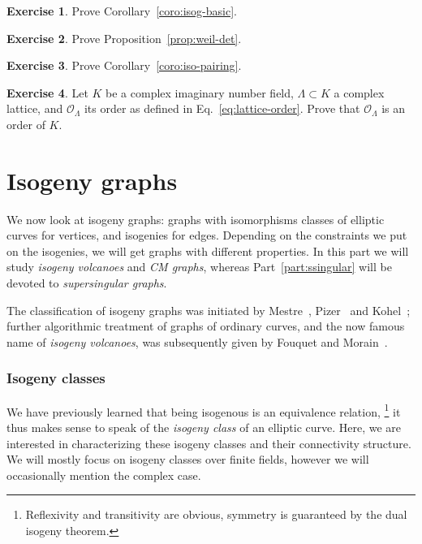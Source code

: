 \documentclass[10pt]{article}
\theoremstyle{plain}
\theoremstyle{definition}
\newtheorem{exercise}{Exercise}[part]
\def\O{\ensuremath{\mathcal{O}}}
\begin{document}
\begin{exercise}
  Prove Corollary~\ref{coro:isog-basic}.
\end{exercise}

\begin{exercise}
  Prove Proposition~\ref{prop:weil-det}.
\end{exercise}

\begin{exercise}
  Prove Corollary~\ref{coro:iso-pairing}.
\end{exercise}

\begin{exercise}
  Let $K$ be a complex imaginary number field, $Λ⊂K$ a complex
  lattice, and $\O_Λ$ its order as defined in
  Eq.~\eqref{eq:lattice-order}. %
  Prove that $\O_Λ$ is an order of $K$.
\end{exercise}



\clearpage
\part{Isogeny graphs}
\label{part:isogeny-graphs}

We now look at isogeny graphs: graphs with isomorphisms classes of
elliptic curves for vertices, and isogenies for edges. %
Depending on the constraints we put on the isogenies, we will get
graphs with different properties. %
In this part we will study \emph{isogeny volcanoes} and \emph{CM graphs},
whereas Part~\ref{part:ssingular} will be devoted to
\emph{supersingular graphs}.

The classification of isogeny graphs was initiated by
Mestre~\cite{mestre86}, Pizer~\cite{pizer1,pizer2} and
Kohel~\cite{kohel}; further algorithmic treatment of graphs of
ordinary curves, and the now famous name of \emph{isogeny volcanoes},
was subsequently given by Fouquet and
Morain~\cite{fouquet+morain02}. %


\section{Isogeny classes}

We have previously learned that being isogenous is an equivalence
relation,%
\footnote{Reflexivity and transitivity are obvious, symmetry is
  guaranteed by the dual isogeny theorem.} %
it thus makes sense to speak of the \emph{isogeny class} of an elliptic
curve. %
Here, we are interested in characterizing these isogeny classes and
their connectivity structure. %
We will mostly focus on isogeny classes over finite fields, however we
will occasionally mention the complex case.
\end{document}
